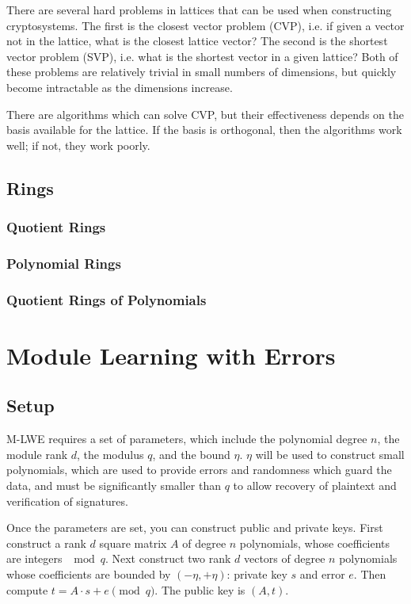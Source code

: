 \documentclass{article}
\begin{document}
There are several hard problems in lattices that can be used when constructing cryptosystems.  The first is the closest vector problem (CVP), i.e. if given a vector not in the lattice, what is the closest lattice vector?  The second is the shortest vector problem (SVP), i.e. what is the shortest vector in a given lattice?  Both of these problems are relatively trivial in small numbers of dimensions, but quickly become intractable as the dimensions increase.

There are algorithms which can solve CVP, but their effectiveness depends on the basis available for the lattice.  If the basis is orthogonal, then the algorithms work well; if not, they work poorly.  

\subsection{
  Rings
}

\subsubsection{
  Quotient Rings
}

\subsubsection{
  Polynomial Rings
}

\subsubsection{
  Quotient Rings of Polynomials
}

\newpage
\section{
  Module Learning with Errors
}

\subsection{
  Setup
}

M-LWE requires a set of parameters, which include the polynomial degree $n$, the module rank $d$, the modulus $q$, and the bound $\eta$.  $\eta$ will be used to construct small polynomials, which are used to provide errors and randomness which guard the data, and must be significantly smaller than $q$ to allow recovery of plaintext and verification of signatures.

Once the parameters are set, you can construct public and private keys.  First construct a rank $d$ square matrix $A$ of degree $n$ polynomials, whose coefficients are integers $\mod{q}$.  Next construct two rank $d$ vectors of degree $n$ polynomials whose coefficients are bounded by $(-\eta, +\eta)$: private key $s$ and error $e$.  Then compute $t = A \cdot s + e \pmod{q}$.  The public key is $(A, t)$.
\end{document}
